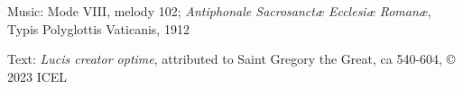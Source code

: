 

\begin{hymnsource}
Music: Mode VIII, melody 102; \emph{Antiphonale Sacrosanctæ Ecclesiæ Romanæ}, Typis Polyglottis Vaticanis, 1912

Text: \emph{Lucis creator optime}, attributed to Saint Gregory the Great, ca 540-604, © 2023 ICEL
\end{hymnsource}
